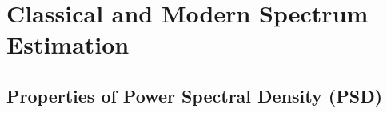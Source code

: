 \documentclass[12pt]{article}
\date{12th April 2019}
\numberwithin{equation}{section}
\begin{document}
	



\newpage
\setcounter{tocdepth}{2} %
\tableofcontents
\newpage
\section{Classical and Modern Spectrum Estimation} \label{sec: 1-CMSE}
	\subsection{Properties of Power Spectral Density (PSD)} \label{sec: 1-1-prop-PSD}
	
\end{document}
